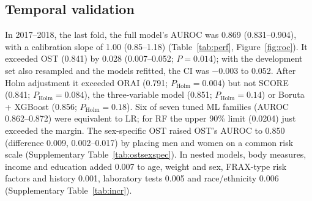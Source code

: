 \documentclass[11pt,a4paper]{article}
\begin{document}
\subsection{Temporal validation}
In 2017--2018, the last fold, the full model's AUROC was 0.869 (0.831--0.904), with a calibration slope of 1.00 (0.85--1.18) (Table~\ref{tab:perf}, Figure~\ref{fig:roc}). It exceeded OST (0.841) by 0.028 (0.007--0.052; $P=0.014$); with the development set also resampled and the models refitted, the CI was $-$0.003 to 0.052. After Holm adjustment it exceeded ORAI (0.791; $P_{\text{Holm}}=0.004$) but not SCORE (0.841; $P_{\text{Holm}}=0.084$), the three-variable model (0.851; $P_{\text{Holm}}=0.14$) or Boruta + XGBoost (0.856; $P_{\text{Holm}}=0.18$). Six of seven tuned ML families (AUROC 0.862--0.872) were equivalent to LR; for RF the upper 90\% limit (0.0204) just exceeded the margin. The sex-specific OST raised OST's AUROC to 0.850 (difference 0.009, 0.002--0.017) by placing men and women on a common risk scale (Supplementary Table~\ref{tab:ostsexspec}). In nested models, body measures, income and education added 0.007 to age, weight and sex, FRAX-type risk factors and history 0.001, laboratory tests 0.005 and race/ethnicity 0.006 (Supplementary Table~\ref{tab:incr}).
\end{document}
